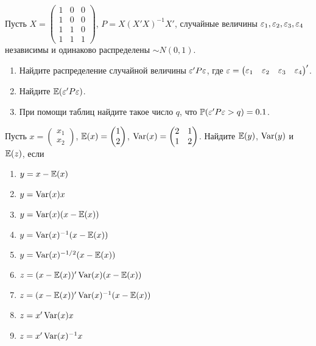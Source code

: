 \documentclass[pdftex,11pt,openany]{book}\usepackage[]{graphicx}\usepackage[]{color}
\begin{document}
\begin{solution}
\end{solution}


\begin{problem}


Пусть $X = \begin{pmatrix} 1 & 0 & 0 \\ 1 & 0 & 0 \\ 1 & 1 & 0  \\ 1 & 1 & 1 \end{pmatrix} $, $P = X(X'X)^{-1}X'$, случайные величины $\varepsilon_1, \varepsilon_2, \varepsilon_3, \varepsilon_4$ независимы и одинаково распределены $\sim N (0,1)$.
\begin{enumerate}
\item Найдите распределение случайной величины $\varepsilon'P\varepsilon$, где $\varepsilon = \begin{pmatrix} \varepsilon_1 & \varepsilon_2 & \varepsilon_3 & \varepsilon_4 \end{pmatrix}'$.
\item Найдите $\mathbb{E}(\varepsilon'P\varepsilon)$.
\item При помощи таблиц найдите такое число $q$, что $\mathbb{P}(\varepsilon'P\varepsilon > q)=0.1$. 
\end{enumerate}
\end{problem}

\begin{solution}
\end{solution}



\begin{problem}
Пусть  $x = \begin{pmatrix} x_1 \\ x_2 \end{pmatrix}$, $\mathbb{E}(x) = \begin{pmatrix} 1 \\ 2 \end{pmatrix}$, $\operatorname{Var}(x) = \begin{pmatrix} 2 & 1 \\ 1 & 2 \end{pmatrix}$. Найдите $\mathbb{E}(y)$, $\operatorname{Var}(y)$ и $\mathbb{E}(z)$, если
\begin{enumerate}
\item $y = x - \mathbb{E}(x)$
\item $y = \operatorname{Var}(x)x$
\item $y = \operatorname{Var}(x)(x - \mathbb{E}(x))$
\item $y = \operatorname{Var}(x)^{-1}(x - \mathbb{E}(x))$
\item $y = \operatorname{Var}(x)^{-1/2}(x - \mathbb{E}(x))$
\item $z = (x - \mathbb{E}(x))'\operatorname{Var}(x)(x - \mathbb{E}(x))$
\item $z = (x - \mathbb{E}(x))'\operatorname{Var}(x)^{-1}(x - \mathbb{E}(x))$
\item $z = x'\operatorname{Var}(x)x$
\item $z = x'\operatorname{Var}(x)^{-1}x$
\end{enumerate}


\end{problem}
\end{document}
